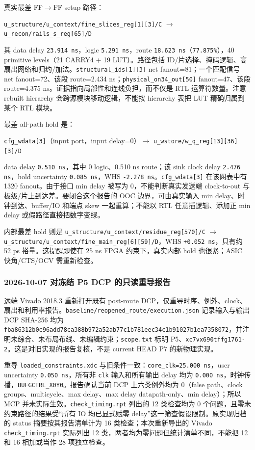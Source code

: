\documentclass[UTF8,fontset=fandol,10pt,a4paper,openany]{ctexrep}
\newcommand{\code}[1]{\nolinkurl{#1}}
\begin{document}
真实最差 FF\ensuremath{\rightarrow}FF setup 路径：


\code{u_structure/u_context/fine_slices_reg[1][3]/C} \ensuremath{\rightarrow} \code{u_recon/rails_s_reg[65]/D}


其 data delay \code{23.914 ns}，logic \code{5.291 ns}，route \code{18.623 ns}（\code{77.875\%}），40 primitive levels（21 CARRY4 + 19 LUT）。路径包括 ID/片选择、掩码逻辑、高扇出网络和归约/加法。\code{structural_ids[1][3]} net fanout=81；一个匹配信号 net fanout=72、该段 route=2.434 ns；\code{physical_on34_out[50]} fanout=47、该段 route=4.375 ns。证据指向局部性和连线负担，而不仅是 RTL 运算符数量。注意 rebuilt hierarchy 会跨源模块移动逻辑，不能按 hierarchy 表把 LUT 精确归属到某个 RTL 模块。


最差 all-path hold 是：


\code{cfg_wdata[3]}（input port，input delay=0）\ensuremath{\rightarrow} \code{u_wstore/w_q_reg[13][36][3]/D}


data delay \code{0.510 ns}，其中 0 logic、0.510 ns route；该 sink clock delay \code{2.476 ns}，hold uncertainty \code{0.085 ns}，WHS \code{-2.278 ns}。\code{cfg_wdata[3]} 在该网表中有 1320 fanout。由于接口 min delay 被写为 0，不能判断真实发送端 clock-to-out 与板级/片上到达差。要闭合这个报告的 OOC 边界，可由真实输入 min delay、时钟到达、buffer/IO 和端点 skew 一起重算；不能以 RTL 任意插逻辑、添加正 min delay 或假路径直接把数字变绿。


内部最差 hold 则是 \code{u_structure/u_context/residue_reg[570]/C} \ensuremath{\rightarrow} \code{u_structure/u_context/fine_main_reg[6][59]/D}，WHS \code{+0.052 ns}，只有约 52 ps 裕量。这提醒即使在 25 ns FPGA 约束下，真实内部 hold 也很紧；ASIC 快角/CTS/OCV 需重新检查。


\subsubsection{2026-10-07 对冻结 P5 DCP 的只读重导报告}


远端 Vivado 2018.3 重新打开既有 post-route DCP，仅重导时序、例外、clock、扇出和利用率报告。\code{baseline/reopened_route/execution.json} 记录输入与输出 DCP SHA-256 均为 \code{fba86312b0c96add78ca388b972a52ab77c1b781eec34c1b91027b1ea7358072}，并注明未综合、未布局布线、未编辑约束；\code{scope.txt} 标明 P5、\code{xc7vx690tffg1761-2}。这是对旧实现的报告复核，不是 current HEAD P7 的新物理实现。


重导 \code{loaded_constraints.xdc} 与旧条件一致：\code{core_clk=25.000 ns}，user uncertainty \code{0.050 ns}，所有非 \code{clk} 输入和所有输出 delay 均为 \code{0.000 ns}，时钟传播，\code{BUFGCTRL_X0Y0}。报告确认当前 DCP 上六类例外均为 0（false path、clock groups、multicycle、max delay、max delay datapath-only、min delay）；所以 MCP 并未实际生效。\code{check_timing.rpt} 列出的 12 类检查均为 0 个问题，且零未约束路径的结果受“所有 IO 均已显式赋零 delay”这一筛查假设限制。原实现归档的 status 摘要按其报告清单计为 16 类检查；本次重新导出的 Vivado \code{check_timing.rpt} 实际列出 12 类，两者均为零问题但统计清单不同，不能把 12 和 16 相加或当作 28 项独立检查。
\end{document}
